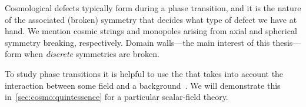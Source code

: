 


    
    Cosmological defects typically form during a phase transition, and it is the nature of the associated (broken) symmetry that decides what type of defect we have at hand. We mention cosmic strings and monopoles arising from axial and spherical symmetry breaking, respectively. Domain walls---the main interest of this thesis---form when \emph{discrete} symmetries are broken. 
    
    To study phase transitions it is helpful to use the  that takes into account the interaction between some field and a background~\citep{vachaspatiKinksDomainWalls2006,kolbEarlyUniverse1990}. We will demonstrate this in~\cref{sec:cosmo:quintessence} for a particular scalar-field theory. %








